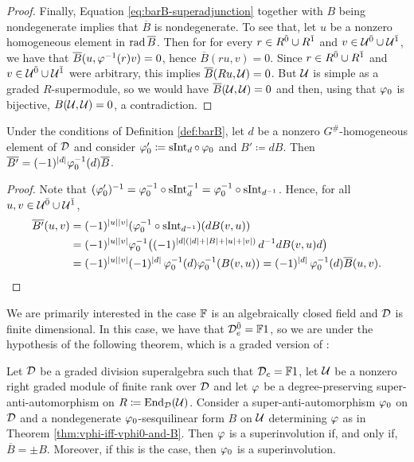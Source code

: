 \begin{proof}
	Finally, Equation \eqref{eq:barB-superadjunction} together with $B$ being nondegenerate implies that $\overline{B}$ is nondegenerate.
	To see that, let $u$ be a nonzero homogeneous element in $\operatorname{rad} \overline{B}$.
	Then for for every $r\in R^{\bar0} \cup R^{\bar1}$ and $v\in \mathcal U^{\bar0} \cup \mathcal U^{\bar1}$, we have that $\overline{B}(u, \varphi^{-1} (r) v) = 0$, hence $\overline{B}(ru, v) = 0$.
	Since $r \in R^{\bar0} \cup R^{\bar1}$ and $v\in \mathcal U^{\bar0} \cup \mathcal U^{\bar1}$ were arbitrary, this implies $\overline{B} (Ru, \mathcal U) = 0$.
	But $\mathcal U$ is simple as a graded $R$-supermodule, so we would have $\overline{B}(\mathcal U, \mathcal U) = 0$ and then, using that $\varphi_0$ is bijective, $B (\mathcal U, \mathcal U) = 0$, a contradiction.
\end{proof}

\begin{lemma}\label{lemma:bar-dB}
	Under the conditions of Definition \ref{def:barB}, let $d$ be a nonzero $G^\#$-homogeneous element of $\mathcal{D}$ and consider $\varphi_0' \coloneqq \operatorname{sInt}_d\circ\, \varphi_0$ and $B' \coloneqq d B$.
	Then $\overline {B'} = (-1)^{|d|} \varphi_0^{-1} (d) \overline B$.
\end{lemma}

\begin{proof}
	Note that $(\varphi_0')^{-1} = \varphi_0^{-1} \circ \operatorname{sInt}_{d}^{-1} = \varphi_0^{-1} \circ \operatorname{sInt}_{d^{-1}}$.
	Hence, for all $u, v \in \mathcal U^{\bar0} \cup \mathcal U^{\bar1}$,
	\begin{align*}
		\overline {B'} (u,v) & = (-1)^{|u||v|} (\varphi_0^{-1} \circ \operatorname{sInt}_{d^{-1}})  (d B(v, u) )                    \\
		                     & = (-1)^{|u||v|} \varphi_0^{-1} \big( (-1)^{|d| (|d| + |B| + |u| + |v|)}\,  d^{-1} d B (v, u) d \big) \\ &= (-1)^{|u||v|} (-1)^{|d|}\, \varphi_0^{-1} (d) \varphi_0^{-1}(B(v, u)) =  (-1)^{|d|}\,\varphi_0^{-1} (d) \overline {B} (u, v).
	\end{align*}
\end{proof}

We are primarily interested in the case $\mathbb{F}$ is an algebraically closed field and $\mathcal{D}$ is finite dimensional.
In this case, we have that $\mathcal{D}^{\bar0}_e = \mathbb{F} 1$, so we are under the hypothesis of the following theorem, which is a graded version of \cite[Theorem 7]{racine}:

\begin{thm}\label{thm:vphi-involution-iff-delta-pm-1}
	Let $\mathcal{D}$ be a graded division superalgebra such that $\mathcal{D}_e = \mathbb{F} 1$, let $\mathcal U$ be a nonzero right graded module of finite rank over $\mathcal{D}$ and let $\varphi$ be a degree-preserving super-anti-automorphism on $R \coloneqq \operatorname{End}_{\mathcal{D}} (\mathcal U)$.
	Consider a super-anti-automorphism $\varphi_0$ on $\mathcal{D}$ and a nondegenerate $\varphi_0$-sesqui\-li\-near form $B$ on $\mathcal U$ determining $\varphi$ as in Theorem \ref{thm:vphi-iff-vphi0-and-B}.
	Then $\varphi$ is a superinvolution if, and only if, $\overline B = \pm B$. 
	Moreover, if this is the case, then $\varphi_0$ is a superinvolution. 
\end{thm}

